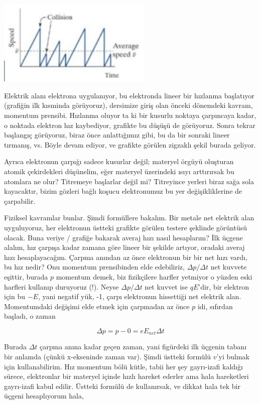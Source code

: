 \documentclass[12pt,fleqn]{article}\usepackage{../../common}
\begin{document}
\includegraphics[width=20em]{04_15.png}

Elektrik alanı elektrona uygulanıyor, bu elektronda lineer bir hızlanma
başlatıyor (grafiğin ilk kısminda görüyoruz), dersimize giriş olan önceki
dönemdeki kavram, momentum prensibi. Hızlanma oluyor ta ki bir kusurlu noktaya
çarpıncaya kadar, o noktada elektron hız kaybediyor, grafikte bu düşüşü de
görüyoruz. Sonra tekrar başlangıç görüyoruz, biraz önce anlattığımız gibi, bu
da bir sonraki lineer tırmanış, vs. Böyle devam ediyor, ve grafikte görülen
zigzaklı şekil burada geliyor.

Ayrıca elektronun çarpığı sadece kusurlar değil; materyel örgüyü oluşturan
atomik çekirdekleri düşünelim, eğer materyel üzerindeki ısıyı arttırırsak bu
atomlara ne olur? Titremeye başlarlar değil mi? Titreyince yerleri biraz sağa
sola kayacaktır, bizim gözleri bağlı koşucu elektronumuz bu yer değişikliklerine
de çarpabilir.

Fiziksel kavramlar bunlar. Şimdi formüllere bakalım. Bir metale net
elektrik alan uyguluyoruz, her elektronun üstteki grafikte görülen testere
şeklinde görüntüsü olacak. Buna veriye / grafiğe bakarak averaj hızı nasıl
hesaplarım? İlk üçgene alalım, hız çarpışa kadar zamana göre lineer bir
şekilde artıyor, oradaki averaj hızı hesaplayacağım. Çarpma anından az önce
elektronun bir bir net hızı vardı, bu hız nedir? Onu momentum prensibinden
elde edebiliriz, $\Delta p / \Delta t$ net kuvvete eşittir, burada $p$
momentum demek, biz fizikçilere harfler yetmiyor o yüzden eski harfleri
kullanıp duruyoruz (!). Neyse $\Delta p / \Delta t$ net kuvvet ise
$qE$'dir, bir elektron için bu $-E$, yani negatif yük, -1, çarpı elektronun
hissettiği net elektrik alan. Momentumdaki değişimi elde etmek için
çarpmadan az önce $p$ idi, sıfırdan başladı, o zaman

$$ \Delta p = p - 0 = e E_{net} \Delta t$$

Burada $\Delta t$ çarpma anına kadar geçen zaman, yani figürdeki ilk
üçgenin tabanı bir anlamda (çünkü x-ekseninde zaman var). Şimdi üstteki
formülü $v$'yi bulmak için kullanabilirim. Hız momentum bölü kütle, tabii
her şey gayrı-izafi kaldığı sürece, elektronlar bir materyel içinde hızlı
hareket ederler ama hala hareketleri gayrı-izafi kabul edilir. Üstteki
formülü de kullanırsak, ve dikkat hala tek bir üçgeni hesaplıyorum hala, 
\end{document}
